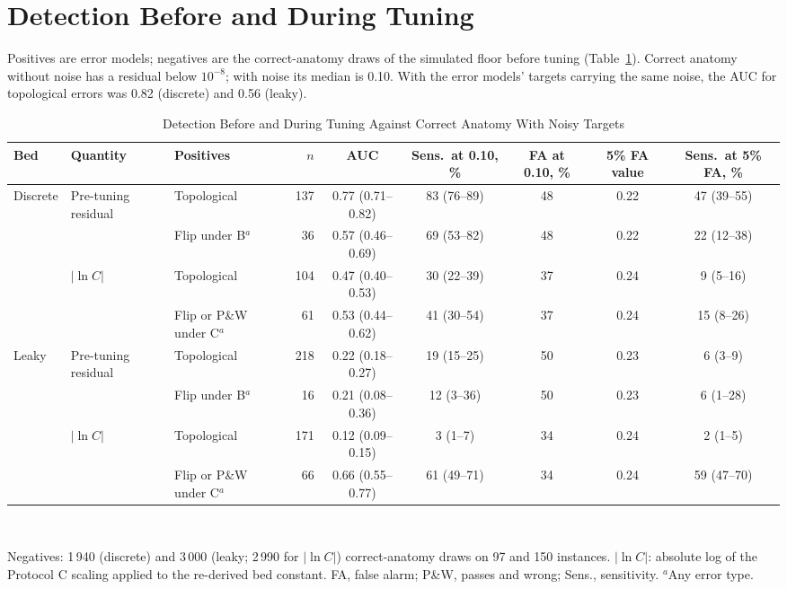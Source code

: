 \documentclass[journal,twoside,web,onecolumn]{ieeecolor}
\begin{document}
\FloatBarrier
{}
\section{Detection Before and During Tuning}\label{sec:detector}
Positives are error models; negatives are the correct-anatomy draws of the simulated floor before tuning
(Table~\ref{tab:detector}). Correct anatomy without noise has a residual below $10^{-8}$; with noise its median is
0.10. With the error models' targets carrying the same noise, the AUC for topological errors was 0.82 (discrete) and
0.56 (leaky).
\begin{table}[!ht]
\caption{Detection Before and During Tuning Against Correct Anatomy With Noisy Targets}\label{tab:detector}
\centering\footnotesize\setlength{\tabcolsep}{4pt}
\begin{tabular}{@{}lllrccccc@{}}
\toprule
Bed & Quantity & Positives & $n$ & AUC & Sens.\ at 0.10, \% & FA at 0.10, \% & 5\% FA value & Sens.\ at 5\% FA, \%\\
\midrule
Discrete & Pre-tuning residual & Topological & 137 & 0.77 (0.71--0.82) & 83 (76--89) & 48 & 0.22 & 47 (39--55) \\
 &  & Flip under B$^a$ & 36 & 0.57 (0.46--0.69) & 69 (53--82) & 48 & 0.22 & 22 (12--38) \\
 & $|\ln C|$ & Topological & 104 & 0.47 (0.40--0.53) & 30 (22--39) & 37 & 0.24 & 9 (5--16) \\
 &  & Flip or P\&W under C$^a$ & 61 & 0.53 (0.44--0.62) & 41 (30--54) & 37 & 0.24 & 15 (8--26) \\
\addlinespace[2pt]
Leaky & Pre-tuning residual & Topological & 218 & 0.22 (0.18--0.27) & 19 (15--25) & 50 & 0.23 & 6 (3--9) \\
 &  & Flip under B$^a$ & 16 & 0.21 (0.08--0.36) & 12 (3--36) & 50 & 0.23 & 6 (1--28) \\
 & $|\ln C|$ & Topological & 171 & 0.12 (0.09--0.15) & 3 (1--7) & 34 & 0.24 & 2 (1--5) \\
 &  & Flip or P\&W under C$^a$ & 66 & 0.66 (0.55--0.77) & 61 (49--71) & 34 & 0.24 & 59 (47--70) \\
\bottomrule
\end{tabular}
\\[3pt]
\parbox{0.9\textwidth}{\footnotesize Negatives: 1\,940 (discrete) and 3\,000 (leaky; 2\,990 for $|\ln C|$) correct-anatomy draws on 97 and 150 instances. $|\ln C|$: absolute log of the Protocol C scaling applied to the re-derived bed constant. FA, false alarm; P\&W,
passes and wrong; Sens., sensitivity. $^a$Any error type.}
\end{table}
\end{document}
